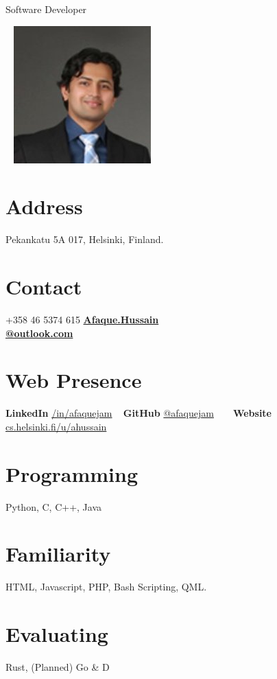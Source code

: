 \documentclass[]{friggeri-cv}
\begin{document}
      {Software Developer}
      


\begin{aside}
  ~
  \includegraphics[scale=0.50]{img/me.jpg}
  ~
  \section{Address}
    Pekankatu 5A 017,
    Helsinki,
    Finland.
    ~
  \section{Contact}
    +358 46 5374 615
    \href{mailto:Afaque.Hussain@outlook.com}{\textbf{Afaque.Hussain\\@outlook.com}}
    ~
  \section{Web Presence}
    \textbf{LinkedIn}
        \href{http://www.linkedin.com/in/afaquejam}{/in/afaquejam}
    ~
    \textbf{GitHub}
        \href{https://github.com/afaquejam}{@afaquejam}
    ~
    ~
    \textbf{Website}
        \href{http://www.cs.helsinki.fi/u/ahussain/}{cs.helsinki.fi/u/ahussain}
    ~
  \section{Programming}
    Python, C, C++, Java
    ~
  \section{Familiarity}
    HTML, Javascript,
    PHP, Bash Scripting,
    QML.
    ~
 \section{Evaluating}
    Rust, (Planned) Go \& D 
  ~

\end{aside}
\end{document}
